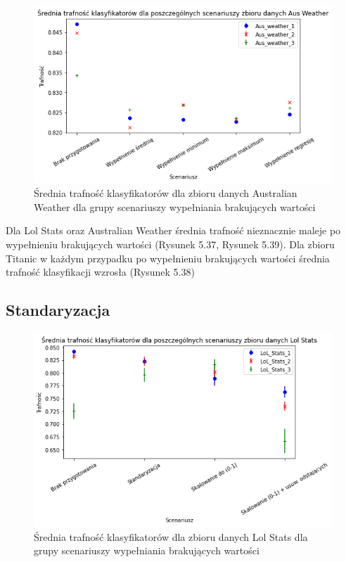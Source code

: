 \documentclass{book}
\begin{document}
\begin{figure}[H]
    \centerline{\includegraphics[scale=0.5]{Aus_Weather_Avg_Wypełnienie_brakujących}}
    \centering
    \caption{Średnia trafność klasyfikatorów dla zbioru danych Australian Weather 
    dla grupy scenariuszy wypełniania brakujących wartości}
    \end{figure}


    Dla Lol Stats oraz Australian Weather średnia trafność nieznacznie maleje po wypełnieniu brakujących wartości (Rysunek 5.37, Rysunek 5.39). 
    Dla zbioru Titanic w każdym przypadku po wypełnieniu brakujących wartości średnia trafność klasyfikacji wzrosła (Rysunek 5.38)


\subsection{Standaryzacja}

\begin{figure}[H]
    \centerline{\includegraphics[scale=0.5]{Lol_Stats_Avg_Standaryzacja}}
    \centering
    \caption{Średnia trafność klasyfikatorów dla zbioru danych Lol Stats 
    dla grupy scenariuszy wypełniania brakujących wartości}
    \end{figure}
\end{document}
